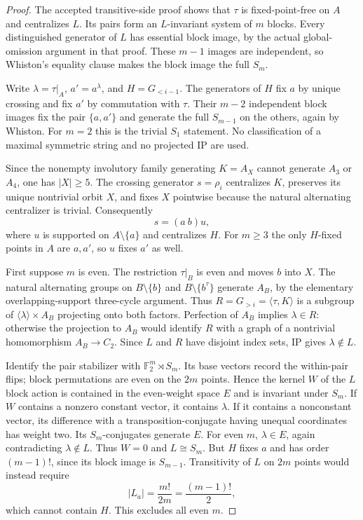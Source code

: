 \documentclass[11pt,a4paper]{article}
\newcommand{\gen}[1]{\langle#1\rangle}
\begin{document}
\begin{proof}
The accepted transitive-side proof shows that $\tau$ is
fixed-point-free on $A$ and centralizes $L$. Its pairs form
an $L$-invariant system of $m$ blocks. Every distinguished
generator of $L$ has essential block image, by the actual
global-omission argument in that proof. These $m-1$ images
are independent, so Whiston's equality clause makes the
block image the full $S_m$.

Write $\lambda=\tau|_A$, $a'=a^\lambda$, and
$H=G_{<i-1}$. The generators of $H$ fix $a$ by unique crossing
and fix $a'$ by commutation with $\tau$. Their $m-2$
independent block images fix the pair $\{a,a'\}$ and generate
the full $S_{m-1}$ on the others, again by Whiston. For $m=2$
this is the trivial $S_1$ statement. No classification of a
maximal symmetric string and no projected IP are used.

Since the nonempty involutory family generating $K=A_X$
cannot generate $A_3$ or $A_4$, one has $|X|\geq5$.
The crossing generator $s=\rho_i$ centralizes $K$, preserves
its unique nontrivial orbit $X$, and fixes $X$ pointwise
because the natural alternating centralizer is trivial.
Consequently
\[
                      s=(a\ b)u,
\]
where $u$ is supported on $A\setminus\{a\}$ and centralizes
$H$. For $m\geq3$ the only $H$-fixed points in $A$ are
$a,a'$, so $u$ fixes $a'$ as well.

First suppose $m$ is even. The restriction $\tau|_B$ is even
and moves $b$ into $X$. The natural alternating groups on
$B\setminus\{b\}$ and $B\setminus\{b^\tau\}$ generate
$A_B$, by the elementary overlapping-support three-cycle
argument. Thus $R=G_{>i}=\gen{\tau,K}$ is a subgroup of
$\gen\lambda\times A_B$ projecting onto both factors.
Perfection of $A_B$ implies $\lambda\in R$: otherwise
the projection to $A_B$ would identify $R$ with a graph of
a nontrivial homomorphism $A_B\to C_2$.
Since $L$ and $R$ have disjoint index sets, IP gives
$\lambda\notin L$.

Identify the pair stabilizer with $\mathbb F_2^m\rtimes S_m$.
Its base vectors record the within-pair flips; block
permutations are even on the $2m$ points. Hence the kernel
$W$ of the $L$ block action is contained in the even-weight
space $E$ and is invariant under $S_m$.
If $W$ contains a nonzero constant vector, it contains
$\lambda$. If it contains a nonconstant vector, its difference
with a transposition-conjugate having unequal coordinates
has weight two. Its $S_m$-conjugates generate $E$.
For even $m$, $\lambda\in E$, again contradicting
$\lambda\notin L$. Thus $W=0$ and $L\cong S_m$.
But $H$ fixes $a$ and has order $(m-1)!$, since its block
image is $S_{m-1}$. Transitivity of $L$ on $2m$ points
would instead require
\[
                  |L_a|=\frac{m!}{2m}=\frac{(m-1)!}{2},
\]
which cannot contain $H$. This excludes all even $m$.


\end{proof}
\end{document}
